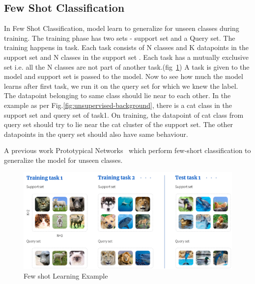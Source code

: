 \subsection{Few Shot Classification}\label{sec:algo:unsup:fsc}
	    In Few Shot Classification, model learn to generalize for unseen classes during training. The training phase has two sets - support set and a Query set. The training happens in task. Each task consists of N classes and K datapoints in the support set and N classes in the support set . Each task has a mutually exclusive set i.e. all the N classes are not part of another task.(fig~\ref{fig:unsupervised-fewshot})
    A task is given to the model and support set is passed to the model. Now to see how much the model learns after first task, we run it on the query set for which we knew the label. The datapoint belonging to same class should lie near to each other. In the example as per Fig.\ref{fig:unsupervised-background}, there is a cat class in the support set and query set of task1. On training, the datapoint of cat class from query set should try to lie near the cat cluster of the support set. The other datapoints in the query set should also have same behaviour.
	

A previous work Prototypical Networks~\cite{protonet:NIPS2017} which perform few-short classification to generalize the model for unseen classes.

\begin{figure}[t]
    \centering
    \includegraphics[scale=0.4]{figures/chapter-3/unsupervised_few_shot.png}
    \caption{Few shot Learning Example}
     \label{fig:unsupervised-fewshot}
\end{figure}


